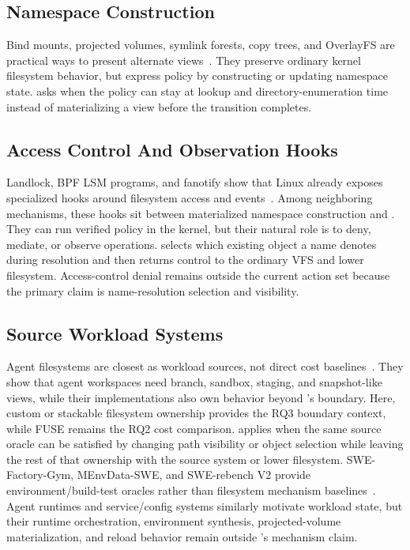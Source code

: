 \subsection{Namespace Construction}

Bind mounts, projected volumes, symlink forests, copy trees, and OverlayFS are
practical ways to present alternate views~\cite{kubernetes_projected_volumes,linux_overlayfs}.
They preserve ordinary kernel filesystem behavior, but express policy by
constructing or updating namespace state. \namei asks when the policy can stay
at lookup and directory-enumeration time instead of materializing a view before
the transition completes.

\subsection{Access Control And Observation Hooks}

Landlock, BPF LSM programs, and fanotify show that Linux already exposes
specialized hooks around filesystem access and events~\cite{linux_landlock,linux_bpf_lsm,linux_fanotify}.
Among neighboring mechanisms, these hooks sit between materialized namespace
construction and \namei. They can run verified policy in the kernel, but their
natural role is to deny, mediate, or observe operations. \namei selects which
existing object a name denotes during resolution and then returns control to the
ordinary VFS and lower filesystem. Access-control denial remains outside the
current action set because the primary claim is name-resolution selection and
visibility.

\subsection{Source Workload Systems}

Agent filesystems are closest as workload sources, not direct cost
baselines~\cite{agentfs_repo,branchfs_repo,sandlock_repo,yolofs_repo}. They
show that agent workspaces need branch, sandbox, staging, and snapshot-like
views, while their implementations also own behavior beyond \namei's boundary.
Here, custom or stackable filesystem ownership provides the RQ3 boundary
context, while FUSE remains the RQ2 cost comparison.
\namei applies when the same source oracle can be satisfied by changing path
visibility or object selection while leaving the rest of that ownership with the
source system or lower filesystem. SWE-Factory-Gym, MEnvData-SWE, and
SWE-rebench V2 provide environment/build-test oracles rather than filesystem
mechanism baselines~\cite{swe_factory_repo,menvagent_repo,swe_rebench_v2_repo}.
Agent runtimes and service/config systems similarly motivate workload state,
but their runtime orchestration, environment synthesis, projected-volume
materialization, and reload behavior remain outside \namei's mechanism claim.

